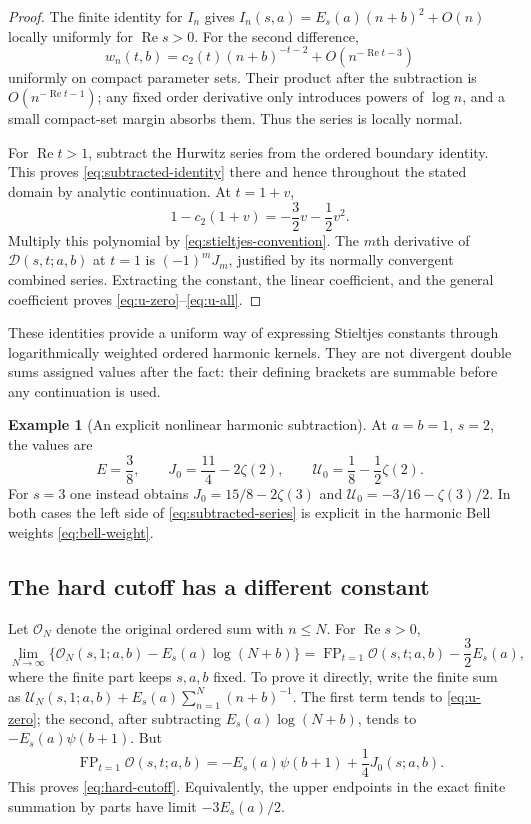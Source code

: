 \documentclass[11pt,a4paper]{article}
\numberwithin{equation}{section}
\theoremstyle{definition}
\newtheorem{example}[theorem]{Example}
\theoremstyle{remark}
\DeclareMathOperator{\FP}{FP}
\newcommand{\Rea}{\operatorname{Re}}
\newcommand{\Ord}{\mathcal O}
\newcommand{\Def}{\mathcal D}
\begin{document}
\begin{proof}
The finite identity for $I_n$ gives
$I_n(s,a)=E_s(a)(n+b)^2+O(n)$ locally uniformly for $\Rea s>0$.
For the second difference,
\[
 w_n(t,b)=c_2(t)(n+b)^{-t-2}+O(n^{-\Rea t-3})
\]
uniformly on compact parameter sets. Their product after the
subtraction is $O(n^{-\Rea t-1})$; any fixed order derivative only
introduces powers of $\log n$, and a small compact-set margin
absorbs them. Thus the series is locally normal.

For $\Rea t>1$, subtract the Hurwitz series from the ordered
boundary identity. This proves \eqref{eq:subtracted-identity} there
and hence throughout the stated domain by analytic continuation.
At $t=1+v$,
\[
 1-c_2(1+v)=-\frac32v-\frac12v^2.
\]
Multiply this polynomial by \eqref{eq:stieltjes-convention}.
The $m$th derivative of $\Def(s,t;a,b)$ at $t=1$ is
$(-1)^mJ_m$, justified by its normally convergent combined series.
Extracting the constant, the linear coefficient, and the general
coefficient proves \eqref{eq:u-zero}--\eqref{eq:u-all}.
\end{proof}

These identities provide a uniform way of expressing Stieltjes
constants through logarithmically weighted ordered harmonic kernels.
They are not divergent double sums assigned values after the fact:
their defining brackets are summable before any continuation is used.

\begin{example}[An explicit nonlinear harmonic subtraction]
At $a=b=1$, $s=2$, the values are
\[
 E=\frac38,\qquad J_0=\frac{11}{4}-2\zeta(2),\qquad
 \mathcal U_0=\frac18-\frac12\zeta(2).
\]
For $s=3$ one instead obtains
$J_0=15/8-2\zeta(3)$ and
$\mathcal U_0=-3/16-\zeta(3)/2$.
In both cases the left side of \eqref{eq:subtracted-series} is
explicit in the harmonic Bell weights \eqref{eq:bell-weight}.
\end{example}

\subsection{The hard cutoff has a different constant}

Let $\Ord_N$ denote the original ordered sum with $n\le N$.
For $\Rea s>0$,
\begin{equation}\label{eq:hard-cutoff}
 \lim_{N\to\infty}
 \{\Ord_N(s,1;a,b)-E_s(a)\log(N+b)\}
 =\FP_{t=1}\Ord(s,t;a,b)-\frac32E_s(a),
\end{equation}
where the finite part keeps $s,a,b$ fixed. To prove it directly,
write the finite sum as
$\mathcal U_N(s,1;a,b)+E_s(a)\sum_{n=1}^N(n+b)^{-1}$.
The first term tends to \eqref{eq:u-zero}; the second, after
subtracting $E_s(a)\log(N+b)$, tends to $-E_s(a)\psi(b+1)$.
But
\begin{equation}\label{eq:fixed-order-fp}
 \FP_{t=1}\Ord(s,t;a,b)
 =-E_s(a)\psi(b+1)+\frac14J_0(s;a,b).
\end{equation}
This proves \eqref{eq:hard-cutoff}. Equivalently, the upper endpoints
in the exact finite summation by parts have limit $-3E_s(a)/2$.
\end{document}
